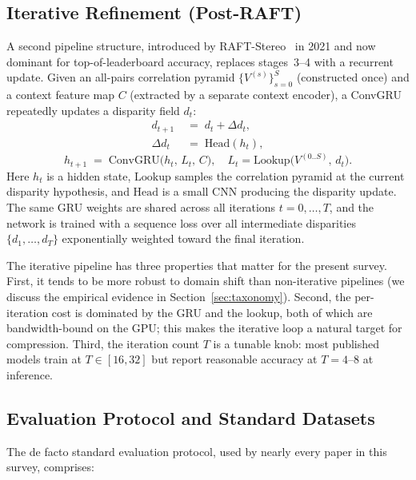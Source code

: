 \subsection{Iterative Refinement (Post-RAFT)}

A second pipeline structure, introduced by RAFT-Stereo~\cite{lipson2021raftstereo} in 2021 and now dominant for top-of-leaderboard accuracy, replaces stages~3--4 with a recurrent update. Given an all-pairs correlation pyramid $\{V^{(s)}\}_{s=0}^{S}$ (constructed once) and a context feature map $C$ (extracted by a separate context encoder), a ConvGRU repeatedly updates a disparity field $d_t$:
\begin{equation}
\begin{aligned}
d_{t+1} &\;=\; d_t + \Delta d_t, \\
\Delta d_t &\;=\; \mathrm{Head}(h_t),
\end{aligned}
\end{equation}
\begin{equation}
h_{t+1} \;=\; \mathrm{ConvGRU}\bigl(h_t,\, L_t,\, C\bigr),
\quad L_t = \mathrm{Lookup}\bigl(V^{(0..S)},\, d_t\bigr).
\end{equation}
Here $h_t$ is a hidden state, $\mathrm{Lookup}$ samples the correlation pyramid at the current disparity hypothesis, and $\mathrm{Head}$ is a small CNN producing the disparity update. The same GRU weights are shared across all iterations $t = 0, \ldots, T$, and the network is trained with a sequence loss over all intermediate disparities $\{d_1, \ldots, d_T\}$ exponentially weighted toward the final iteration.

The iterative pipeline has three properties that matter for the present survey. First, it tends to be more robust to domain shift than non-iterative pipelines (we discuss the empirical evidence in Section~\ref{sec:taxonomy}). Second, the per-iteration cost is dominated by the GRU and the lookup, both of which are bandwidth-bound on the GPU; this makes the iterative loop a natural target for compression. Third, the iteration count $T$ is a tunable knob: most published models train at $T \in [16, 32]$ but report reasonable accuracy at $T = 4$--$8$ at inference.

\subsection{Evaluation Protocol and Standard Datasets}

The de facto standard evaluation protocol, used by nearly every paper in this survey, comprises:


